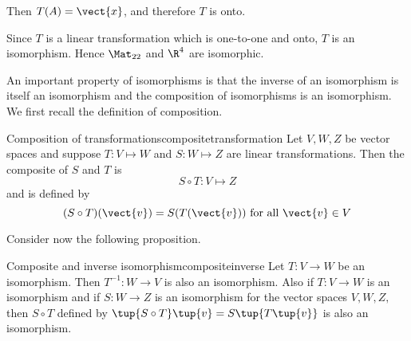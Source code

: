 \begin{solution}
Then $T(A)=\vect{x}$, and therefore $T$ is onto.

Since $T$ is a linear transformation which is one-to-one and onto, $T$ is an isomorphism. Hence $\Mat_{22}$ and $\R^4$ are isomorphic.
\end{solution}

An important property of isomorphisms is that the inverse of an isomorphism
is itself an isomorphism and the composition of isomorphisms is an
isomorphism. We first recall the definition of composition.

\begin{definition}{Composition of transformations}{compositetransformation}
Let $V, W, Z$ be vector spaces and suppose $T: V \mapsto W$ and $S: W \mapsto Z$ are linear transformations. Then the composite of $S$ and $T$ is
\[
S \circ T: V \mapsto Z
\]
and is defined by 
\[
(S \circ T) (\vect{v}) = S(T(\vect{v})) \mbox{ for all } \vect{v} \in V
\]
\end{definition}

Consider now the following proposition.

\begin{proposition}{Composite and inverse isomorphism}{compositeinverse}
Let $T:V\rightarrow W$ be an isomorphism. Then $T^{-1}:W\rightarrow V$ is
also an isomorphism. Also if $T:V\rightarrow W$ is an isomorphism and if $
S:W\rightarrow Z$ is an isomorphism for the vector spaces $V,W,Z,$ then $
S\circ T$ defined by $\tup{S\circ T} \tup{v} = S\tup{
T\tup{v} } $ is also an isomorphism.
\end{proposition}

